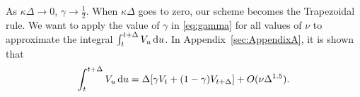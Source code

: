 \documentclass{ws-ijfe}
\begin{document}
As $\kappa\Delta\rightarrow 0$, $\gamma\rightarrow\frac{1}{2} $.
When $\kappa\Delta$ goes to zero, our scheme becomes the Trapezoidal rule.
We want to apply the value of $\gamma$ in \eqref{eq:gamma} for all values of $\nu$ to approximate the integral $\int_{t}^{t+\Delta}V_u \,\mathrm{d} u$. In Appendix~\ref{sec:AppendixA}, it is shown that
\begin{equation*}
  \int_{t}^{t+\Delta}V_u\,\mathrm{d} u = \Delta[\gamma V_t+(1-\gamma) V_{t+\Delta}] + O(\nu\Delta^{1.5}).
\end{equation*}
\end{document}
